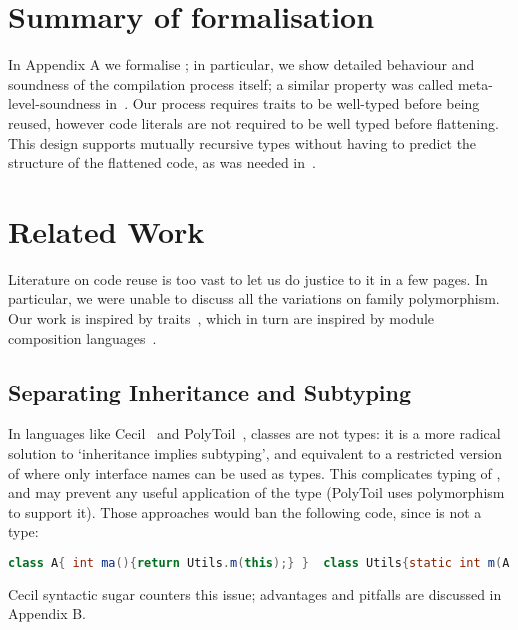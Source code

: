 \saveSpace
\section{Summary of formalisation}
\saveSpace
In Appendix A we formalise \name; in particular, we 
show detailed behaviour and soundness
of the compilation process itself;
a similar property was called meta-level-soundness in~\cite{servetto2014meta}.
Our process requires traits to be well-typed before being reused,
however code literals are not required to be well typed before flattening.
This design supports mutually recursive types without having to
predict the structure of the flattened code, as was
needed in~\cite{deep}.

\saveSpace
\section{Related Work}
\saveSpace
Literature on code reuse is too vast to let us do justice to it in a few pages.
In particular, we were unable to discuss all the variations on family polymorphism.
Our work is inspired by traits~\cite{ducasse2006traits}, which in turn
are inspired by module composition languages~\cite{ancona2002calculus}.

\subsection{Separating Inheritance and Subtyping}
In languages like Cecil~\cite{chambers1995typechecking} and PolyToil~\cite{bruce1995polytoil},
classes are not types: it is a more radical solution to `inheritance implies subtyping', and equivalent to a restricted version of \name where only interface names can be used as types.
This complicates typing of \Q@this@,
and may prevent any useful application of the \Q@This@ type (PolyToil uses polymorphism to support it).
Those approaches would ban the following code,
since \Q@A@ is not a type:
\saveSpace\saveSpace\begin{lstlisting}[language=Java]
class A{ int ma(){return Utils.m(this);} }  class Utils{static int m(A a){..}}
\end{lstlisting}\saveSpace\saveSpace
Cecil syntactic sugar counters this issue; advantages and pitfalls are discussed in Appendix B.

